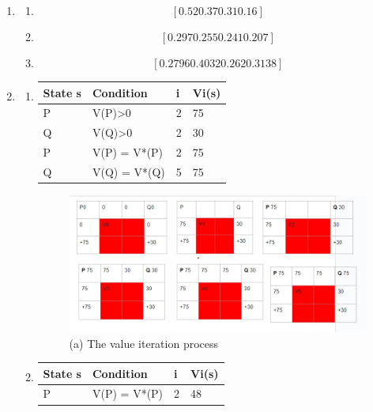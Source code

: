 \documentclass[12pt]{article}
\begin{document}
\begin{enumerate}
\item
  \begin{enumerate}
  \item $$[0.52 0.37 0.31 0.16]$$
  \item $$ [0.297 0.255 0.241 0.207] $$
  \item $$ [0.2796 0.4032 0.262  0.3138] $$
  \end{enumerate}
  \item
  \begin{enumerate}
    \item 
    \begin{tabular}{llll}
    \hline
    State s & Condition           & i & Vi(s) \\ \hline
    P       & V(P)\textgreater{}0 & 2  & 75      \\
    Q       & V(Q)\textgreater{}0 & 2  & 30      \\
    P       & V(P) = V*(P)        & 2  & 75      \\
    Q       & V(Q) = V*(Q)        & 5  & 75     
    \end{tabular}
    \begin{figure}[h]
    \centering
    \includegraphics[width=1\textwidth]{q3.jpg}
    \caption{(a) The value iteration process}
    \label{fig:hw6_1}
    \end{figure}

  \item
    \begin{tabular}{llll}
    \hline
    State s & Condition    & i & Vi(s) \\ \hline
    P       & V(P) = V*(P) & 2  & 48     
    \end{tabular}


\end{enumerate}
\end{enumerate}
\end{document}
